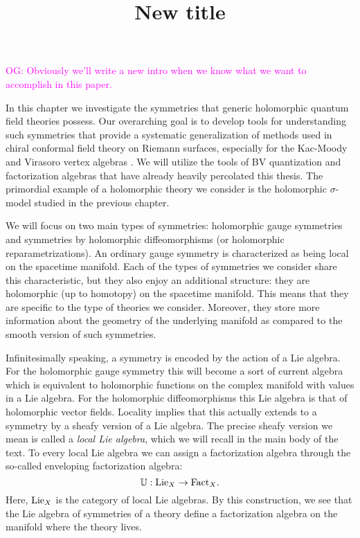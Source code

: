 \documentclass[10pt]{amsart}
\title{New title}
\def\owen{\textcolor{magenta}{OG: }\textcolor{magenta}}
\begin{document}
\maketitle
\tableofcontents


\owen{Obviously we'll write a new intro when we know what we want to accomplish in this paper.}

In this chapter we investigate the symmetries that generic holomorphic quantum field theories possess.
Our overarching goal is to develop tools for understanding such symmetries that provide a systematic generalization of methods used in chiral conformal field theory on Riemann surfaces, especially for the Kac-Moody and Virasoro vertex algebras \cite{IgorKM, KacVertex, BorcherdsVertex}. 
We will utilize the tools of BV quantization and factorization algebras that have already heavily percolated this thesis.
The primordial example of a holomorphic theory we consider is the holomorphic $\sigma$-model studied in the previous chapter. 

We will focus on two main types of symmetries: holomorphic gauge symmetries and symmetries by holomorphic diffeomorphisms (or holomorphic reparametrizations). 
An ordinary gauge symmetry is characterized as being local on the spacetime manifold. 
Each of the types of symmetries we consider share this characteristic, but they also enjoy an additional structure: they are holomorphic (up to homotopy) on the spacetime manifold. 
This means that they are specific to the type of theories we consider.
Moreover, they store more information about the geometry of the underlying manifold as compared to the smooth version of such symmetries.

Infinitesimally speaking, a symmetry is encoded by the action of a Lie algebra.
For the holomorphic gauge symmetry this will become a sort of current algebra which is equivalent to holomorphic functions on the complex manifold with values in a Lie algebra.
For the holomorphic diffeomorphisms this Lie algebra is that of holomorphic vector fields.
Locality implies that this actually extends to a symmetry by a sheafy version of a Lie algebra. 
The precise sheafy version we mean is called a {\em local Lie algebra}, which we will recall in the main body of the text. 
To every local Lie algebra we can assign a factorization algebra through the so-called enveloping factorization algebra:
\[
\mathbb{U} : {\rm Lie}_X \to {\rm Fact}_X .
\]
Here, ${\rm Lie}_X$ is the category of local Lie algebras.
By this construction, we see that the Lie algebra of symmetries of a theory define a factorization algebra on the manifold where the theory lives. 
\end{document}
